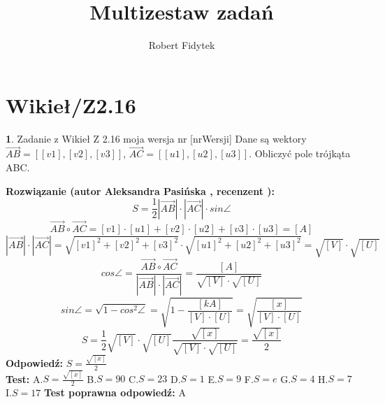 \documentclass[12pt, a4paper]{article}
\title{Multizestaw zadań}
\author{Robert Fidytek}
\date{}
\theoremstyle{definition} %
\newtheorem{zad}{}
\newcommand{\kategoria}[1]{\section{#1}} %
\newcommand{\zadStart}[1]{\begin{zad}#1\newline} %
\newcommand{\zadStop}{\end{zad}}   %
\newcommand{\rozwStart}[2]{\noindent \textbf{Rozwiązanie (autor #1 , recenzent #2): }\newline} %
\newcommand{\rozwStop}{\newline}                                            %
\newcommand{\odpStart}{\noindent \textbf{Odpowiedź:}\newline}    %
\newcommand{\odpStop}{\newline}                                             %
\newcommand{\testStart}{\noindent \textbf{Test:}\newline} %
\newcommand{\testStop}{\newline} %
\newcommand{\kluczStart}{\noindent \textbf{Test poprawna odpowiedź:}\newline} %
\newcommand{\kluczStop}{\newline} %
\begin{document}
\maketitle


\kategoria{Wikieł/Z2.16}
\zadStart{Zadanie z Wikieł Z 2.16 moja wersja nr [nrWersji]}
Dane są wektory $\overrightarrow{AB}=[[v1],[v2],[v3]]$, $\overrightarrow{AC}=[[u1],[u2],[u3]]$. Obliczyć pole trójkąta ABC.
\zadStop
\rozwStart{Aleksandra Pasińska}{}
$$S=\frac{1}{2}|\overrightarrow{AB}|\cdot |\overrightarrow{AC}|\cdot sin\angle$$
$$\overrightarrow{AB}\circ \overrightarrow{AC}=[v1]\cdot [u1]+[v2]\cdot [u2]+[v3]\cdot [u3]=[A]$$
$$|\overrightarrow{AB}|\cdot |\overrightarrow{AC}|=\sqrt{[v1]^2+[v2]^2+[v3]^2}\cdot \sqrt{[u1]^2+[u2]^2+[u3]^2}=\sqrt{[V]}\cdot\sqrt{[U]}$$
$$cos\angle=\frac{\overrightarrow{AB}\circ \overrightarrow{AC}}{|\overrightarrow{AB}|\cdot |\overrightarrow{AC}|} =\frac{[A]}{\sqrt{[V]}\cdot \sqrt{[U]}}$$
$$sin\angle=\sqrt{1-cos^2\angle}=\sqrt{1-\frac{[kA]}{[V]\cdot [U]}}=\sqrt{\frac{[x]}{[V]\cdot [U]}}$$
$$S=\frac{1}{2}\sqrt{[V]}\cdot\sqrt{[U]}\frac{\sqrt{[x]}}{\sqrt{[V]}\cdot \sqrt{[U]}}=\frac{\sqrt{[x]}}{2}$$
\rozwStop
\odpStart
$S=\frac{\sqrt{[x]}}{2}$\\
\odpStop
\testStart
A.$S=\frac{\sqrt{[x]}}{2}$
B.$S=90$
C.$S=23$
D.$S=1$
E.$S=9$
F.$S=e$
G.$S=4$
H.$S=7$
I.$S=17$
\testStop
\kluczStart
A
\kluczStop
\end{document}
